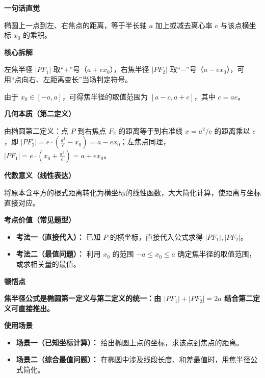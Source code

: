 \begin{explanationbox}
	\textbf{\textcolor{CExplanation}{一句话直觉}}

	椭圆上一点到左、右焦点的距离，等于半长轴 $a$ 加上或减去离心率 $e$ 与该点横坐标 $x_0$ 的乘积。

	\medskip
	\textbf{\textcolor{CExplanation}{核心拆解}}
	\begin{description}[style=nextline, leftmargin=2.8em, labelsep=0.5em, itemsep=0.45em]
		\item[\textbf{要点一（符号对应）：}] 左焦半径 $|PF_1|$ 取“$+$”号（$a+ex_0$），右焦半径 $|PF_2|$ 取“$-$”号（$a-ex_0$），可用“点向右、左距离变长”当场判定符号。
		\item[\textbf{要点二（范围约束）：}] 由于 $x_0\in[-a,a]$，可得焦半径的取值范围为 $[a-c, a+c]$，其中 $c=ae$。
	\end{description}

	\medskip
	\textbf{\textcolor{CExplanation}{几何本质（第二定义）}}

	由椭圆第二定义：点 $P$ 到右焦点 $F_2$ 的距离等于到右准线 $x=a^2/c$ 的距离乘以 $e$，即 $|PF_2| = e\cdot\left(\frac{a^2}{c} - x_0\right) = a - ex_0$；左焦点同理，$|PF_1| = e\cdot\left(x_0 + \frac{a^2}{c}\right) = a + ex_0$。

	\medskip
	\textbf{\textcolor{CExplanation}{代数意义（线性表达）}}

	将原本含平方的根式距离转化为横坐标的线性函数，大大简化计算，使距离与坐标直接对应。

	\medskip
	\textbf{\textcolor{CExplanation}{考点价值（常见题型）}}
	\begin{itemize}[leftmargin=*, itemsep=0.5em, topsep=0.4em]
		\item \textbf{考法一（直接代入）：} 已知 $P$ 的横坐标，直接代入公式求得 $|PF_1|,|PF_2|$。
		\item \textbf{考法二（最值问题）：} 利用 $x_0$ 的范围 $-a\le x_0\le a$ 确定焦半径的取值范围，或求相关量的最值。
	\end{itemize}

	\medskip
	\textbf{\textcolor{CExplanation}{顿悟点}}

	\textbf{焦半径公式是椭圆第一定义与第二定义的统一：由 $|PF_1|+|PF_2|=2a$ 结合第二定义可直接推出。}

	\medskip
	\textbf{\textcolor{CExplanation}{使用场景}}
	\begin{itemize}[leftmargin=*, itemsep=0.5em, topsep=0.4em]
		\item \textbf{场景一（已知坐标计算）：} 给出椭圆上点的坐标，求该点到焦点的距离。
		\item \textbf{场景二（综合最值问题）：} 在椭圆中涉及线段长度、和差最值时，用焦半径公式简化。
	\end{itemize}



\end{explanationbox}
